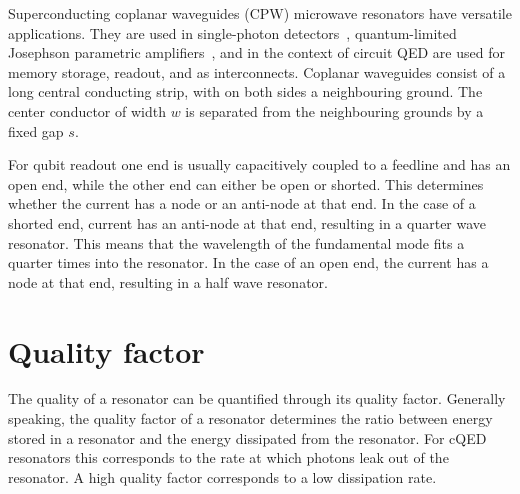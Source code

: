 
    Superconducting coplanar waveguides (CPW) microwave resonators have versatile applications. They are used in single-photon detectors~\cite{tanner2010enhanced}, quantum-limited Josephson parametric amplifiers~\cite{castellanos2008amplification}, and in the context of circuit QED are used for memory storage, readout, and as interconnects. Coplanar waveguides consist of a long central conducting strip, with on both sides a neighbouring ground. The center conductor of width $w$ is separated from the neighbouring grounds by a fixed gap $s$.

    For qubit readout one end is usually capacitively coupled to a feedline and has an open end, while the other end can either be open or shorted. This determines whether the current has a node or an anti-node at that end. In the case of a shorted end, current has an anti-node at that end, resulting in a quarter wave resonator. This means that the wavelength of the fundamental mode fits a quarter times into the resonator. In the case of an open end, the current has a node at that end, resulting in a half wave resonator.


  \section{Quality factor}
    \label{sec:Quality factor}
    The quality of a resonator can be quantified through its quality factor. Generally speaking, the quality factor of a resonator determines the ratio between energy stored in a resonator and the energy dissipated from the resonator. For cQED resonators this corresponds to the rate at which photons leak out of the resonator. A high quality factor corresponds to a low dissipation rate.

